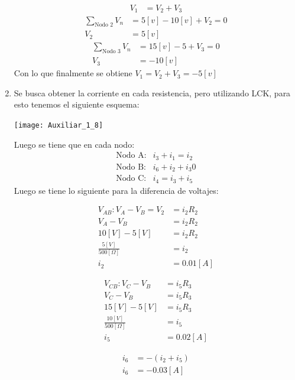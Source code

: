 \documentclass[
  11pt,
  letterpaper,
   addpoints,
   answers
  ]{exam}
\begin{document}
\begin{questions}
\begin{solution}
\begin{enumerate}
\begin{align}
        V_{1} &= V_{2} + V_{3}
    \end{align}
    \begin{align}
        \sum_{\text{Nodo 2}} V_{n} &= 5[v] - 10[v] + V_{2} = 0\\
        V_{2} &= 5[v]
    \end{align}
    \begin{align}
        \sum_{\text{Nodo 3}} V_{n} &= 15[v] - 5 + V_{3} = 0\\
        V_{3} &= -10[v]
    \end{align}
    Con lo que finalmente se obtiene $V_1 = V_2 + V_3 = -5[v]$
    \item Se busca obtener la corriente en cada resistencia, pero utilizando LCK, para esto tenemos el siguiente esquema:
    \begin{center}
        \texttt{[image: Auxiliar\_1\_8]}
    \end{center}
    Luego se tiene que en cada nodo:
    \begin{align}
        \text{Nodo A:}& i_3 + i_1 = i_2\\
        \text{Nodo B:}& i_6 + i_2 + i_3 0\\
        \text{Nodo C:}& i_4 = i_3 + i_5
    \end{align}
    Luego se tiene lo siguiente para la diferencia de voltajes:
    \begin{multicols}{2} %

        \begin{align}
            V_{AB}: V_A - V_B = V_2 &= i_2 R_2 \\
            V_A - V_B &= i_2 R_2 \\
            10[V] - 5[V] &= i_2 R_2 \\
            \frac{5[V]}{500[\Omega]} &= i_2 \\
            i_2 &= 0.01[A]
        \end{align}
    
        \begin{align}
            V_{CB} : V_C - V_B &= i_5 R_3 \\
            V_C - V_B &= i_5 R_3 \\
            15[V] - 5[V] &= i_5 R_3 \\
            \frac{10[V]}{500[\Omega]} &= i_5 \\
            i_5 &= 0.02[A]
        \end{align}
    
        \begin{align}
            i_6 &= -(i_2 + i_5) \\
            i_6 &= -0.03[A]
        \end{align}
    

\end{multicols}
\end{enumerate}
\end{solution}
\end{questions}
\end{document}
